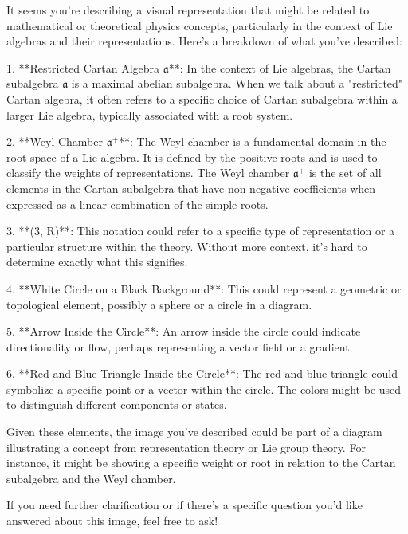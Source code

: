 It seems you're describing a visual representation that might be related to mathematical or theoretical physics concepts, particularly in the context of Lie algebras and their representations. Here's a breakdown of what you've described:

1. **Restricted Cartan Algebra \( \mathfrak{a} \)**: In the context of Lie algebras, the Cartan subalgebra \( \mathfrak{a} \) is a maximal abelian subalgebra. When we talk about a "restricted" Cartan algebra, it often refers to a specific choice of Cartan subalgebra within a larger Lie algebra, typically associated with a root system.

2. **Weyl Chamber \( \mathfrak{a}^+ \)**: The Weyl chamber is a fundamental domain in the root space of a Lie algebra. It is defined by the positive roots and is used to classify the weights of representations. The Weyl chamber \( \mathfrak{a}^+ \) is the set of all elements in the Cartan subalgebra that have non-negative coefficients when expressed as a linear combination of the simple roots.

3. **(3, R)**: This notation could refer to a specific type of representation or a particular structure within the theory. Without more context, it's hard to determine exactly what this signifies.

4. **White Circle on a Black Background**: This could represent a geometric or topological element, possibly a sphere or a circle in a diagram.

5. **Arrow Inside the Circle**: An arrow inside the circle could indicate directionality or flow, perhaps representing a vector field or a gradient.

6. **Red and Blue Triangle Inside the Circle**: The red and blue triangle could symbolize a specific point or a vector within the circle. The colors might be used to distinguish different components or states.

Given these elements, the image you've described could be part of a diagram illustrating a concept from representation theory or Lie group theory. For instance, it might be showing a specific weight or root in relation to the Cartan subalgebra and the Weyl chamber.

If you need further clarification or if there's a specific question you'd like answered about this image, feel free to ask!